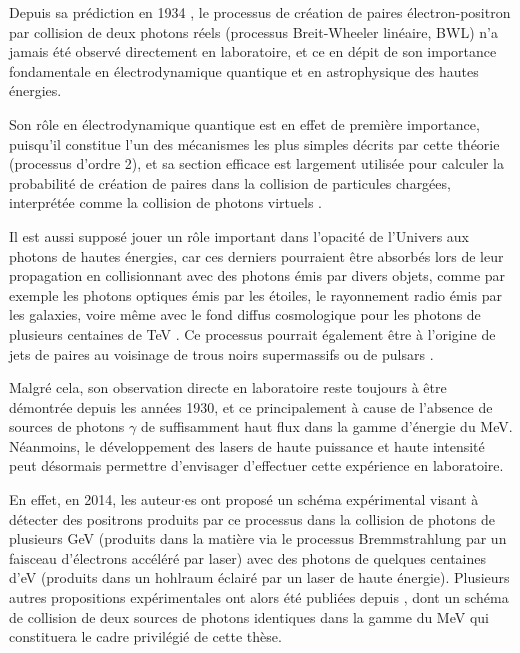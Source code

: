 \begin{refsection}

Depuis sa prédiction en 1934 \parencite{breit_1934}, le processus de création de paires électron-positron par collision de deux photons réels (processus Breit-Wheeler linéaire, BWL) n'a jamais été observé directement en laboratoire, et ce en dépit de son importance fondamentale en électrodynamique quantique et en astrophysique des hautes énergies.

Son rôle en électrodynamique quantique est en effet de première importance, puisqu'il constitue l'un des mécanismes les plus simples décrits par cette théorie (processus d'ordre 2), et sa section efficace est largement utilisée pour calculer la probabilité de création de paires dans la collision de particules chargées, interprétée comme la collision de photons virtuels \parencite{budnev_1975}.

Il est aussi supposé jouer un rôle important dans l'opacité de l'Univers aux photons de hautes énergies, car ces derniers pourraient être absorbés lors de leur propagation en collisionnant avec des photons émis par divers objets, comme par exemple les photons optiques émis par les étoiles, le rayonnement radio émis par les galaxies, voire même avec le fond diffus cosmologique pour les photons de plusieurs centaines de TeV \parencite{diehl_2001, nikishov_1961, gould_1967a, ruffini_2010}. Ce processus pourrait également être à l'origine de jets de paires au voisinage de trous noirs supermassifs \parencite{bonometto_1971} ou de pulsars \parencite{zhang_1998}.

Malgré cela, son observation directe en laboratoire reste toujours à être démontrée depuis les années 1930, et ce principalement à cause de l'absence de sources de photons $\gamma$ de suffisamment haut flux dans la gamme d'énergie du MeV. Néanmoins, le développement des lasers de haute puissance et haute intensité peut désormais permettre d'envisager d'effectuer cette expérience en laboratoire.

En effet, en 2014, les auteur$\cdot$es \cite{pike_2014} ont proposé un schéma expérimental visant à détecter des positrons produits par ce processus dans la collision de photons de plusieurs GeV (produits dans la matière via le processus Bremmstrahlung par un faisceau d'électrons accéléré par laser) avec des photons de quelques centaines d'eV (produits dans un hohlraum éclairé par un laser de haute énergie). Plusieurs autres propositions expérimentales ont alors été publiées depuis \parencite{ribeyre_2016, drebot_2017, yu_2019, wang_2020, he_2020, golub_2020}, dont un schéma de collision de deux sources de photons identiques dans la gamme du MeV \parencite{ribeyre_2016} qui constituera le cadre privilégié de cette thèse.


\end{refsection}
